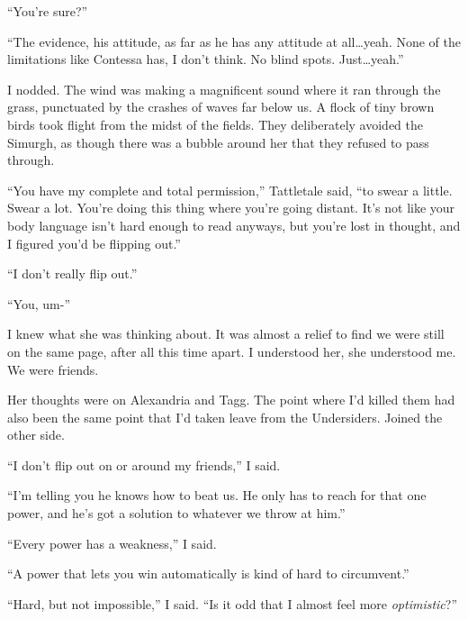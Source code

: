 ``You're sure?''



``The evidence, his attitude, as far as he has any attitude at all\ldots yeah.  None of the limitations like Contessa has, I don't think.  No blind spots.  Just\ldots yeah.''



I nodded.  The wind was making a magnificent sound where it ran through the grass, punctuated by the crashes of waves far below us.  A flock of tiny brown birds took flight from the midst of the fields.   They deliberately avoided the Simurgh, as though there was a bubble around her that they refused to pass through.



``You have my complete and total permission,'' Tattletale said, ``to swear a little.  Swear a lot.  You're doing this thing where you're going distant.  It's not like your body language isn't hard enough to read anyways, but you're lost in thought, and I figured you'd be flipping out.''



``I don't really flip out.''



``You, um-''



I knew what she was thinking about.  It was almost a relief to find we were still on the same page, after all this time apart.  I understood her, she understood me.  We were friends.



Her thoughts were on Alexandria and Tagg.  The point where I'd killed them had also been the same point that I'd taken leave from the Undersiders.  Joined the other side.



``I don't flip out on or around my friends,'' I said.



``I'm telling you he knows how to beat us.  He only has to reach for that one power, and he's got a solution to whatever we throw at him.''



``Every power has a weakness,'' I said.



``A power that lets you win automatically is kind of hard to circumvent.''



``Hard, but not impossible,'' I said.  ``Is it odd that I almost feel more \emph{optimistic}?''



